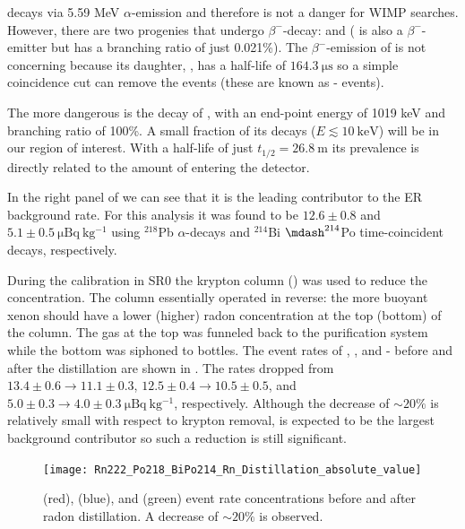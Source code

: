 decays via 5.59 MeV $\alpha$-emission and therefore is not a danger for WIMP searches.  However, there are two progenies that undergo
$\beta^-$-decay:  and  ( is also a $\beta^-$-emitter but has a branching ratio of just
0.021\%).  The $\beta^-$-emission of  is not concerning because its daughter, , has a half-life of
$164.3\ \mathrm{\mu s}$ so a simple coincidence cut can remove the events (these are known as - events).

The more dangerous is the decay of , with an end-point energy of 1019 keV and branching ratio of 100\%.  A small fraction of
its decays ($E \lesssim 10\ \mathrm{keV}$) will be in our region of interest.  With a half-life of just $t_{1/2} = 26.8\ \mathrm{m}$ its
prevalence is directly related to the amount of  entering the detector.

In the right panel of  we can see that it is the leading contributor to
the ER background rate.  For this analysis it was found to be $12.6 \pm 0.8$ and $5.1 \pm 0.5\ \mathrm{\mu Bq\ kg^{-1}}$ using $^{218}$Pb
$\alpha$-decays and $^{214}$Bi $\mdash ^{214}$Po time-coincident decays, respectively.

During the  calibration in SR0 the krypton column () was used to reduce the 
concentration.  The column essentially operated in reverse: the more buoyant xenon should have a lower (higher) radon concentration at the
top (bottom) of the column.  The gas at the top was funneled back to the purification system while the bottom was siphoned to
bottles.  The event rates of , , and - before and after the distillation are shown
in .  The rates dropped from $13.4 \pm 0.6 \rightarrow 11.1 \pm 0.3$,
$12.5 \pm 0.4 \rightarrow 10.5 \pm 0.5$, and $5.0 \pm 0.3 \rightarrow 4.0 \pm 0.3\ \mathrm{\mu Bq\ kg^{-1}}$, respectively.  Although the
decrease of ${\sim}20\%$ is relatively small with respect to krypton removal,  is expected to be the largest background
contributor so such a reduction is still significant.

\begin{figure}
\centering
\texttt{[image: Rn222\_Po218\_BiPo214\_Rn\_Distillation\_absolute\_value]}
\label{fig:backgrounds_electronic_radon_distillation}
\caption{ (red),  (blue), and  (green) event rate concentrations before and after radon
distillation.  A decrease of ${\sim} 20\%$ is observed.}
\end{figure}


